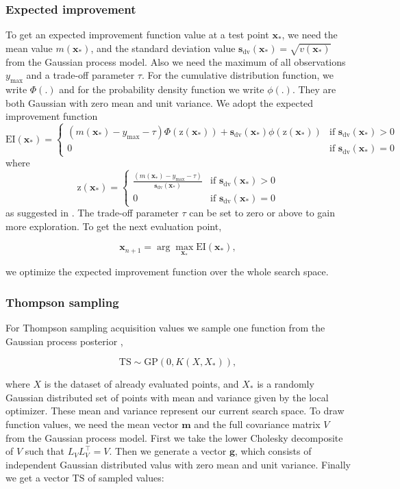 \subsubsection{Expected improvement}
To get an expected improvement function value at a test point $\mathbf{x_*}$, we need the mean value $m(\mathbf{x_*})$, and the standard deviation value $\mathbf{s}_{\mathrm{dv}}(\mathbf{x_*}) = \sqrt{v(\mathbf{x_*})}$ from the Gaussian process model. Also we need the maximum of all observations $y_\mathrm{max}$ and a trade-off parameter $\tau$. For the cumulative distribution function, we write $\Phi(.)$ and for the probability density function we write $\phi(.)$. They are both Gaussian with zero mean and unit variance. We adopt the expected improvement function
\[
    \mathrm{EI}(\mathbf{x_*})=
\begin{cases}
    (m(\mathbf{x_*}) - y_\mathrm{max} - \tau)\Phi(\mathrm{z}(\mathbf{x_*}))+\mathbf{s}_{\mathrm{dv}}(\mathbf{x_*})\phi(\mathrm{z}(\mathbf{x_*}))& \text{if } \mathbf{s}_{\mathrm{dv}}(\mathbf{x_*})> 0\\
    0 & \text{if } \mathbf{s}_{\mathrm{dv}}(\mathbf{x_*})= 0
\end{cases}
\]
where
\[
    \mathrm{z}(\mathbf{x_*})=
\begin{cases}
    \frac{(m(\mathbf{x_*}) -y_\mathrm{max} - \tau)}{\mathbf{s}_{\mathrm{dv}}(\mathbf{x_*})} & \text{if } \mathbf{s}_{\mathrm{dv}}(\mathbf{x_*})> 0\\
    0 & \text{if } \mathbf{s}_{\mathrm{dv}}(\mathbf{x_*})= 0
\end{cases}
\]
as suggested in \cite{brochu2010tutorial}. The trade-off parameter $\tau$ can be set to zero or above to gain more exploration. To get the next evaluation point,

$$\mathbf{x}_{n+1} = \arg \max_{\mathbf{x}_*} \mathrm{EI(\mathbf{x}_*)},$$

we optimize the expected improvement function over the whole search space.

\subsubsection{Thompson sampling}
For Thompson sampling acquisition values we sample one function from the Gaussian process posterior \cite{shahriari2016taking},

$$\mathrm{TS}\sim \mathrm{GP}(0,K(X,X_*)),$$

where $X$ is the dataset of already evaluated points, and $X_*$ is a randomly Gaussian distributed set of points with mean and variance given by the local optimizer. These mean and variance represent our current search space.
To draw function values, we need the mean vector $\mathbf{m}$ and the full covariance matrix $V$ from the Gaussian process model. First we take the lower Cholesky decomposite of $V$ such that $L_V L_V^\top = V$. Then we generate a vector $\mathbf{g}$, which consists of independent Gaussian distributed valus with zero mean and unit variance. Finally we get a vector $\mathrm{TS}$ of sampled values:

